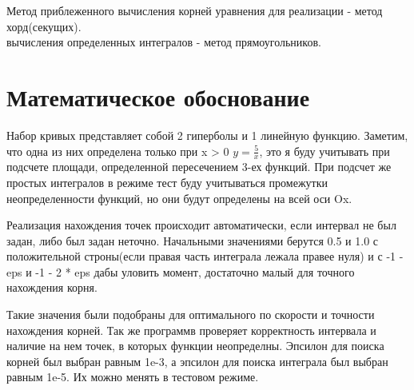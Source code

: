 \documentclass[a4paper,12pt,titlepage,finall]{article}
\begin{document}
Метод приблеженного вычисления корней уравнения для реализации - метод хорд(секущих).\\

 вычисления определенных интегралов - метод прямоугольников.


\section{Математическое обоснование}


Набор кривых представляет собой 2 гиперболы и 1 линейную функцию. Заметим, что одна из них определена только при x > 0
$y=\frac{5}{x}$, это я буду учитывать при подсчете площади, определенной пересечением 3-ех функций.
При подсчет же простых интегралов в режиме тест буду учитываться промежутки неопределенности функций, но они будут определены на 
всей оси Ox.

Реализация нахождения точек происходит автоматически, если интервал не был задан, либо был задан неточно. Начальными значениями
берутся 0.5 и 1.0 с положительной строны(если правая часть интеграла лежала правее нуля) 
и с -1 - eps и -1 - 2 * eps дабы уловить момент, достаточно малый для точного нахождения корня.

Такие значения были подобраны для оптимального по скорости и точности нахождения корней.
Так же программв проверяет корректность интервала и наличие на нем точек, в которых функции неопределны.
Эпсилон для поиска корней был выбран равным 1e-3, а эпсилон для поиска интеграла был выбран равным 1e-5. Их можно менять в тестовом режиме.
\end{document}
